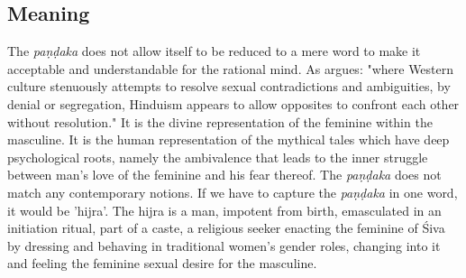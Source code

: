 \subsection{Meaning}
The {\em paṇḍaka} does not allow itself to be reduced to a mere word to make it acceptable and understandable for the rational mind. As \cite{nanda} argues: "where Western culture stenuously attempts to resolve sexual contradictions and ambiguities, by denial or segregation, Hinduism appears to allow opposites to confront each other without resolution." It is the divine representation of the feminine within the masculine. It is the human representation of the mythical tales which have deep psychological roots, namely the ambivalence that leads to the inner struggle between man's love of the feminine and his fear thereof. The {\em paṇḍaka} does not match any contemporary notions. If we have to capture the {\em paṇḍaka} in one word, it would be 'hijra'. The hijra is a man, impotent from birth, emasculated in an initiation ritual, part of a caste, a religious seeker enacting the feminine of Śiva by dressing and behaving in traditional women's gender roles, changing into it and feeling the feminine sexual desire for the masculine.


